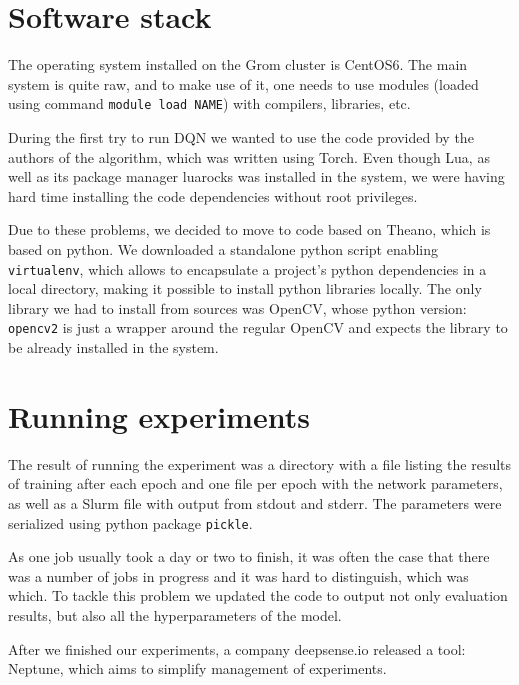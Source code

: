 \begin{appendices}
\section{Software stack}
  The operating system installed on the Grom cluster is CentOS6. The main system is quite raw, and to make use of it, one needs to use modules (loaded using command \texttt{module load NAME}) with compilers, libraries, etc.

  During the first try to run DQN we wanted to use the code provided by the authors of the algorithm, which was written using Torch. Even though Lua, as well as its package manager luarocks was installed in the system, we were having hard time installing the code dependencies without root privileges.

  Due to these problems, we decided to move to code based on Theano, which is based on python. We downloaded a standalone python script enabling \texttt{virtualenv}, which allows to encapsulate a project's python dependencies in a local directory, making it possible to install python libraries locally. The only library we had to install from sources was OpenCV, whose python version: \texttt{opencv2} is just a wrapper around the regular OpenCV and expects the library to be already installed in the system.

\section{Running experiments}
  The result of running the experiment was a directory with a file listing the results of training after each epoch and one file per epoch with the network parameters, as well as a Slurm file with output from stdout and stderr. The parameters were serialized using python package \texttt{pickle}.

  As one job usually took a day or two to finish, it was often the case that there was a number of jobs in progress and it was hard to distinguish, which was which. To tackle this problem we updated the code to output not only evaluation results, but also all the hyperparameters of the model.

  After we finished our experiments, a company deepsense.io released a tool: Neptune, which aims to simplify management of experiments.


\end{appendices}
